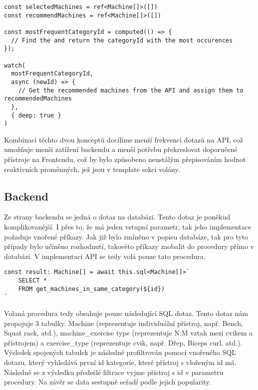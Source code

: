 \begin{lstlisting}
const selectedMachines = ref<Machine[]>([])
const recommendMachines = ref<Machine[]>([])

const mostFrequentCategoryId = computed(() => {
  // Find the and return the categoryId with the most occurences
});

watch(
  mostFrequentCategoryId,
  async (newId) => {
    // Get the recommended machines from the API and assign them to recommendedMachines
  },
  { deep: true }
)
\end{lstlisting}

Kombinací těchto dvou konceptů docílíme menší frekvenci dotazů na API, což umožňuje menší zatížení backendu a menší potřebu překreslovat doporučené přístroje na Frontendu, což by bylo způsobeno neustálým přepisováním hodnot reaktivních proměnných, jež jsou v template sekci volány.

\subsection{Backend}
Ze strany backendu se jedná o dotaz na databázi. Tento dotaz je poněkud komplikovanější. I přes to, že má jeden vstupní parametr, tak jeho implementace požaduje vnořené příkazy. Jak již bylo zmíněno v popisu databáze, tak pro tyto případy bylo učiněno rozhodnutí, takovéto příkazy zaobalit do procedury přímo v databázi. V implementaci API se tedy volá pouze tato procedura.

\begin{lstlisting}
const result: Machine[] = await this.sql<Machine[]>`
    SELECT * 
    FROM get_machines_in_same_category(${id})
`
\end{lstlisting}

Volaná procedura tedy obsahuje pouze následující SQL dotaz. Tento dotaz nám propojuje 3 tabulky. Machine (reprezentuje individuální přístroj, např. Bench, Squat rack, atd.), machine\_exercise type (reprezentuje N:M vztah mezi cvikem a přístrojem) a exercise\_type (reprezentuje cvik, např. Dřep, Biceps curl, atd.). Výsledek spojených tabulek je následně profiltrován pomocí vnořeného SQL dotazu, který vyhledává první id kategorie, které přístroj s vloženým id má. Následně se z výsledku předešlé filtrace vyjme přístroj s id v parametru procedury. Na závěr se data sestupně seřadí podle jejich popularity.


